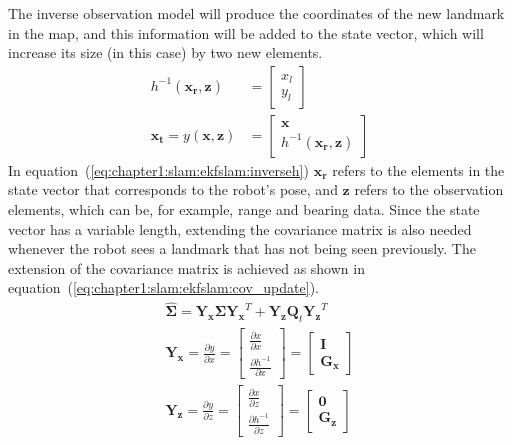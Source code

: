 The inverse observation model will produce the coordinates of the new landmark in the map, and this information will be added to the state vector, which will increase its size (in this case) by two new elements.
\begin{align}
    h^{-1}\left(\bm{x_r}, \bm{z}\right) &= \begin{bmatrix}
        x_l \\ y_l
    \end{bmatrix}
    \label{eq:chapter1:slam:ekfslam:inverseh}\\
    \bm{x_t} = y\left(\bm{x}, \bm{z}\right) &= \begin{bmatrix}
        \bm{x} \\ h^{-1}\left(\bm{x_r}, \bm{z}\right)
    \end{bmatrix}
    \label{eq:chapter1:slam:ekfslam:extension_y}
\end{align}
In equation~(\ref{eq:chapter1:slam:ekfslam:inverseh}) $\bm{x_r}$ refers to the elements in the state vector that corresponds to the robot's pose, and $\bm{z}$ refers to the observation elements, which can be, for example, range and bearing data. Since the state vector has a variable length, extending the covariance matrix is also needed whenever the robot sees a landmark that has not being seen previously. The extension of the covariance matrix is achieved as shown in equation~(\ref{eq:chapter1:slam:ekfslam:cov_update}).
\begin{align}
    \hat{\bm{\Sigma}} = \bm{Y_x} \bm{\Sigma} \bm{Y_x}^T + \bm{Y_z} \bm{Q}_t \bm{Y_z}^T
    \label{eq:chapter1:slam:ekfslam:cov_update}\\
    \bm{Y_x} = \frac{\partial y}{\partial x} = \begin{bmatrix}
        \frac{\partial x}{\partial x} \\ \frac{\partial h^{-1}}{\partial x}
    \end{bmatrix} = \begin{bmatrix}
    \bm{I} \\ \bm{G_x}
    \end{bmatrix}
    \label{eq:chapter1:slam:ekfslam:yx}\\
    \bm{Y_z} = \frac{\partial y}{\partial z} = \begin{bmatrix}
        \frac{\partial x}{\partial z} \\ \frac{\partial h^{-1}}{\partial z}
    \end{bmatrix} = \begin{bmatrix}
        \bm{0} \\ \bm{G_z}
    \end{bmatrix}
    \label{eq:chapter1:slam:ekfslam:yz}
\end{align}
